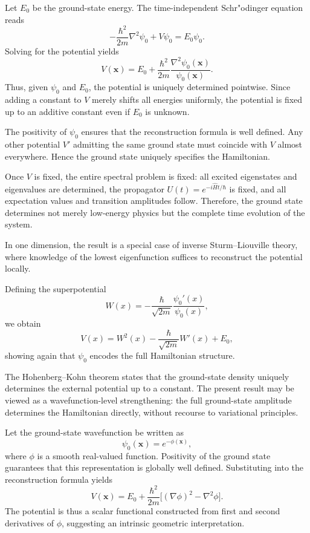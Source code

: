 Let $E_0$ be the ground-state energy. The time-independent Schr"odinger equation reads
\begin{equation}
-\frac{\hbar^2}{2m}\nabla^2\psi_0 + V\psi_0 = E_0\psi_0.
\end{equation}
Solving for the potential yields
\begin{equation}
    \label{pot1d}
V(\mathbf{x}) = E_0 + \frac{\hbar^2}{2m}\frac{\nabla^2\psi_0(\mathbf{x})}{\psi_0(\mathbf{x})}.
\end{equation}
Thus, given $\psi_0$ and $E_0$, the potential is uniquely determined pointwise. Since adding a constant to $V$ merely shifts all energies uniformly, the potential is fixed up to an additive constant even if $E_0$ is unknown.

The positivity of $\psi_0$ ensures that the reconstruction formula is well defined. Any other potential $V'$ admitting the same ground state must coincide with $V$ almost everywhere. Hence the ground state uniquely specifies the Hamiltonian.

Once $V$ is fixed, the entire spectral problem is fixed: all excited eigenstates and eigenvalues are determined, the propagator $U(t)=e^{-i\hat H t/\hbar}$ is fixed, and all expectation values and transition amplitudes follow. Therefore, the ground state determines not merely low-energy physics but the complete time evolution of the system.

In one dimension, the result is a special case of inverse Sturm--Liouville theory, where knowledge of the lowest eigenfunction suffices to reconstruct the potential locally.

Defining the superpotential
\begin{equation}
W(x) = -\frac{\hbar}{\sqrt{2m}}\frac{\psi_0'(x)}{\psi_0(x)},
\end{equation}
we obtain
\begin{equation}
V(x) = W^2(x) - \frac{\hbar}{\sqrt{2m}}W'(x) + E_0,
\end{equation}
showing again that $\psi_0$ encodes the full Hamiltonian structure.

The Hohenberg--Kohn theorem states that the ground-state density uniquely determines the external potential up to a constant. The present result may be viewed as a wavefunction-level strengthening: the full ground-state amplitude determines the Hamiltonian directly, without recourse to variational principles.

Let the ground-state wavefunction be written as
\begin{equation}
\psi_0(\mathbf{x}) = e^{-\phi(\mathbf{x})},
\end{equation}
where $\phi$ is a smooth real-valued function. Positivity of the ground state guarantees that this representation is globally well defined. Substituting into the reconstruction formula yields
\begin{equation}
V(\mathbf{x}) = E_0 + \frac{\hbar^2}{2m}\Big[(\nabla \phi)^2 - \nabla^2 \phi\Big].
\end{equation}
The potential is thus a scalar functional constructed from first and second derivatives of $\phi$, suggesting an intrinsic geometric interpretation.

